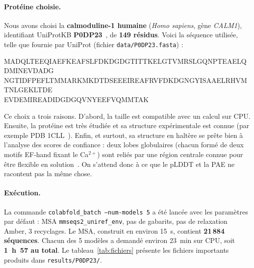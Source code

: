 \paragraph{Protéine choisie.} Nous avons choisi la \textbf{calmoduline-1 humaine} (\emph{Homo sapiens}, gène \emph{CALM1}), identifiant UniProtKB \textbf{P0DP23}~\cite{uniprot_P0DP23,uniprot2023}, de \textbf{149 résidus}. Voici la séquence utilisée, telle que fournie par UniProt (fichier \texttt{data/P0DP23.fasta}) :

\begin{center}
\scriptsize\ttfamily
MADQLTEEQIAEFKEAFSLFDKDGDGTITTKELGTVMRSLGQNPTEAELQDMINEVDADG\\
NGTIDFPEFLTMMARKMKDTDSEEEIREAFRVFDKDGNGYISAAELRHVMTNLGEKLTDE\\
EVDEMIREADIDGDGQVNYEEFVQMMTAK
\end{center}

Ce choix a trois raisons. D'abord, la taille est compatible avec un calcul sur CPU. Ensuite, la protéine est très étudiée et sa structure expérimentale est connue (par exemple PDB 1CLL~\cite{chattopadhyaya1992}). Enfin, et surtout, sa structure en \og haltère \fg{} se prête bien à l'analyse des scores de confiance : deux lobes globulaires (chacun formé de deux motifs EF-hand fixant le Ca$^{2+}$) sont reliés par une région centrale connue pour être flexible en solution~\cite{barbato1992}. On s'attend donc à ce que le pLDDT et la PAE ne racontent pas la même chose.

\paragraph{Exécution.} La commande \texttt{colabfold\_batch --num-models 5} a été lancée avec les paramètres par défaut : MSA \texttt{mmseqs2\_uniref\_env}, pas de gabarits, pas de relaxation Amber, 3 recyclages. Le MSA, construit en environ 15~s, contient \textbf{21\,884 séquences}. Chacun des 5 modèles a demandé environ 23~min sur CPU, soit \textbf{1~h~57 au total}. Le tableau~\ref{tab:fichiers} présente les fichiers importants produits dans \texttt{results/P0DP23/}.

